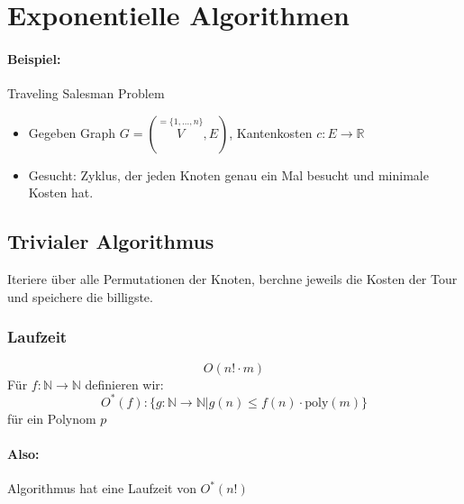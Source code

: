 \section{Exponentielle Algorithmen}
\paragraph{Beispiel:}
Traveling Salesman Problem
\begin{figure}[H]
	\centering
\end{figure}
\begin{itemize}
	\item Gegeben Graph $G=(\overset{=\{1,\ldots,n \}}{V},E)$, Kantenkosten $c:E\rightarrow \mathbb{R}$
	\item Gesucht: Zyklus, der jeden Knoten genau ein Mal besucht und minimale Kosten hat.
\end{itemize}
\subsection{Trivialer Algorithmus}
Iteriere über alle Permutationen der Knoten, berchne jeweils die Kosten der Tour und speichere die billigste.
\subsubsection{Laufzeit}
\[ O(n!\cdot m) \]
Für $f:\mathbb{N}\rightarrow\mathbb{N}$ definieren wir:
\[ O^*(f) : \{ g:\mathbb{N}\rightarrow\mathbb{N} | g(n) \leq f(n)\cdot \text{poly}(m) \} \]
für ein Polynom $p$\\
\paragraph{Also:}
Algorithmus hat eine Laufzeit von $O^*(n!)$\\
